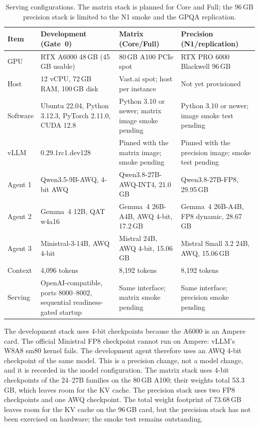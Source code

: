 \begin{table}[H]
  \centering
  \caption{Serving configurations. The matrix stack is planned for Core and Full; the 96\,GB precision stack is limited to the N1 smoke and the GPQA replication.}
  \renewcommand{\arraystretch}{1.3}
  \scriptsize
  \begin{tabular}{|p{}|p{}|p{}|p{}|}
    \hline
    Item & Development (Gate~0) & Matrix (Core/Full) & Precision (N1/replication) \\
    \hline
    GPU & RTX A6000 48\,GB (45\,GB usable) & 80\,GB A100 PCIe spot & RTX PRO 6000 Blackwell 96\,GB \\
    \hline
    Host & 12 vCPU, 72\,GB RAM, 100\,GB disk & Vast.ai spot; host per instance & Not yet provisioned \\
    \hline
    Software & Ubuntu 22.04, Python 3.12.3, PyTorch 2.11.0, CUDA 12.8 & Python 3.10 or newer; matrix image smoke pending & Python 3.10 or newer; image smoke test pending \\
    \hline
    vLLM & 0.29.1rc1.dev128 & Pinned with the matrix image; smoke pending & Pinned with the precision image; smoke test pending \\
    \hline
    Agent 1 & Qwen3.5-9B-AWQ, 4-bit AWQ & Qwen3.8-27B-AWQ-INT4, 21.0\,GB & Qwen3.8-27B-FP8, 29.95\,GB \\
    \hline
    Agent 2 & Gemma~4 12B, QAT w4a16 & Gemma~4 26B-A4B, AWQ 4-bit, 17.2\,GB & Gemma~4 26B-A4B, FP8 dynamic, 28.67\,GB \\
    \hline
    Agent 3 & Ministral-3-14B, AWQ 4-bit & Mistral 24B, AWQ 4-bit, 15.06\,GB & Mistral Small 3.2 24B, AWQ, 15.06\,GB \\
    \hline
    Context & 4{,}096 tokens & 8{,}192 tokens & 8{,}192 tokens \\
    \hline
    Serving & OpenAI-compatible, ports 8000--8002, sequential readiness-gated startup & Same interface; matrix smoke pending & Same interface; precision smoke pending \\
    \hline
  \end{tabular}
  \label{tab:stack}
\end{table}

The development stack uses 4-bit checkpoints because the A6000 is an Ampere card. The official Ministral FP8 checkpoint cannot run on Ampere: vLLM's W8A8 sm80 kernel fails. The development agent therefore uses an AWQ 4-bit checkpoint of the same model. This is a precision change, not a model change, and it is recorded in the model configuration. The matrix stack uses 4-bit checkpoints of the 24--27B families on the 80\,GB A100; their weights total 53.3\,GB, which leaves room for the KV cache. The precision stack uses two FP8 checkpoints and one AWQ checkpoint. The total weight footprint of 73.68\,GB leaves room for the KV cache on the 96\,GB card, but the precision stack has not been exercised on hardware; the smoke test remains outstanding.

